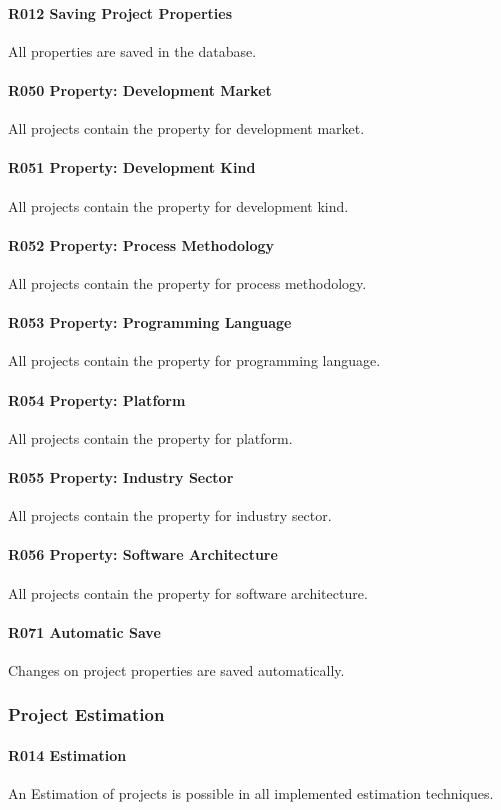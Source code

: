 \paragraph{R012 Saving Project Properties}
All properties are saved in the database.
\paragraph{R050 Property: Development Market}
All projects contain the property for development market.
\paragraph{R051 Property: Development Kind}
All projects contain the property for development kind.
\paragraph{R052 Property: Process Methodology}
All projects contain the property for process methodology.
\paragraph{R053 Property: Programming Language}
All projects contain the property for programming language.
\paragraph{R054 Property: Platform}
All projects contain the property for platform.
\paragraph{R055 Property: Industry Sector}
All projects contain the property for industry sector.
\paragraph{R056 Property: Software Architecture}
All projects contain the property for software architecture.
\paragraph{R071 Automatic Save}
Changes on project properties are saved automatically.

\subsubsection{Project Estimation}
\paragraph{R014 Estimation}
An Estimation of projects is possible in all implemented estimation techniques.
